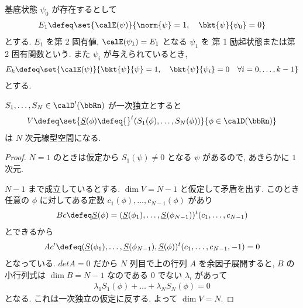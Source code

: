 \documentclass[openany, a4paper, oneside]{jsbook}
\begin{document}
\begin{defn}
基底状態 $\psi_0$ が存在するとして
\begin{align}
 E_1
 \defeq
 \set{\calE (\psi)}{\norm{\psi} = 1, \quad \bkt{\psi}{\psi_0} = 0}
\end{align}
とする.
$E_1$ を第 2 固有値, $\calE (\psi_1) = E_1$ となる $\psi_1$ を
第 1 励起状態または第 2 固有関数という.
また $\psi_i$ が与えられているとき,
\begin{align}
 E_k
 \defeq
 \set{\calE (\psi)}{\bkt{\psi}{\psi} = 1, \quad \bkt{\psi}{\psi_i} = 0 \quad \forall i=0, \dots, k-1}
\end{align}
とする.
\end{defn}

\begin{lem}
$S_1, \dots, S_N \in \calD' (\bbRn)$ が一次独立とすると
\begin{align}
 V
 \defeq
 \set{\underline{S} (\phi) \defeq {}^t(S_1(\phi), \dots, S_N(\phi))}{\phi \in \calD (\bbRn)}
\end{align}
は $N$ 次元線型空間になる.
\end{lem}
\begin{proof}
$N=1$ のときは仮定から $S_1(\psi) \neq 0$ となる $\psi$ があるので,
あきらかに $1$ 次元.

$N-1$ まで成立しているとする.
$\dim V = N-1$ と仮定して矛盾を出す.
このとき任意の $\phi$ に対してある定数 $c_1 (\phi), \dots, c_{N-1}(\phi)$ があり
\begin{align}
 Bc
 \defeq
 \underline{S} (\phi)
 =
 (\underline{S}(\phi_1), \dots, \underline{S}(\phi_{N-1})) {}^t(c_1, \dots, c_{N-1})
\end{align}
とできるから
\begin{align}
 Ac'
 \defeq
 (\underline{S}(\phi_1), \dots, \underline{S}(\phi_{N-1}), \underline{S}(\phi)) {}^t(c_1, \dots, c_{N-1}, -1) =0
\end{align}
となっている.
$detA = 0$ だから $N$ 列目で上の行列 $A$ を余因子展開すると,
$B$ の小行列式は $\dim B = N-1$ なのである $0$ でない $\lambda_i$ があって
\begin{align}
 \lambda_1 S_1(\phi) + \dots + \lambda_N S_N(\phi)
 =
 0
\end{align}
となる.
これは一次独立の仮定に反する.
よって $\dim V = N$.
\end{proof}
\end{document}
